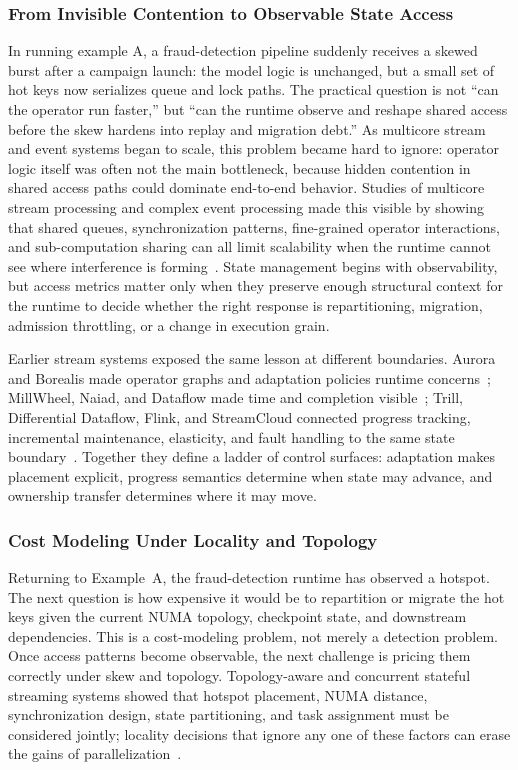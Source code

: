 ﻿\documentclass[manuscript]{acmart}
\begin{document}
\subsubsection{From Invisible Contention to Observable State Access}

In running example A, a fraud-detection pipeline suddenly receives a skewed burst after a campaign launch: the model logic is unchanged, but a small set of hot keys now serializes queue and lock paths. The practical question is not ``can the operator run faster,'' but ``can the runtime observe and reshape shared access before the skew hardens into replay and migration debt.'' As multicore stream and event systems began to scale, this problem became hard to ignore: operator logic itself was often not the main bottleneck, because hidden contention in shared access paths could dominate end-to-end behavior. Studies of multicore stream processing and complex event processing made this visible by showing that shared queues, synchronization patterns, fine-grained operator interactions, and sub-computation sharing can all limit scalability when the runtime cannot see where interference is forming~\cite{zhang2017revisiting,zhang2017mqo}. State management begins with observability, but access metrics matter only when they preserve enough structural context for the runtime to decide whether the right response is repartitioning, migration, admission throttling, or a change in execution grain.

Earlier stream systems exposed the same lesson at different boundaries. Aurora and Borealis made operator graphs and adaptation policies runtime concerns~\cite{abadi2003aurora,abadi2005borealis}; MillWheel, Naiad, and Dataflow made time and completion visible~\cite{akidau2013millwheel,murray2013naiad,akidau2015dataflow}; Trill, Differential Dataflow, Flink, and StreamCloud connected progress tracking, incremental maintenance, elasticity, and fault handling to the same state boundary~\cite{chandramouli2014trill,murray2013differential,carbone2015flink,gulisano2012streamcloud}. Together they define a ladder of control surfaces: adaptation makes placement explicit, progress semantics determine when state may advance, and ownership transfer determines where it may move.

\subsubsection{Cost Modeling Under Locality and Topology}

Returning to Example~A, the fraud-detection runtime has observed a hotspot. The next question is how expensive it would be to repartition or migrate the hot keys given the current NUMA topology, checkpoint state, and downstream dependencies. This is a cost-modeling problem, not merely a detection problem. Once access patterns become observable, the next challenge is pricing them correctly under skew and topology. Topology-aware and concurrent stateful streaming systems showed that hotspot placement, NUMA distance, synchronization design, state partitioning, and task assignment must be considered jointly; locality decisions that ignore any one of these factors can erase the gains of parallelization~\cite{zhang2019briskstream,zhang2020concurrent}.
\end{document}
